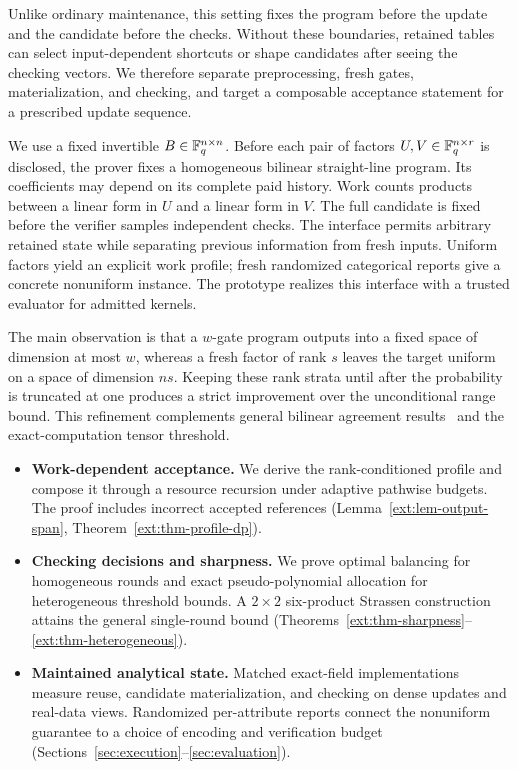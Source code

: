 Unlike ordinary maintenance, this setting fixes the program before the
update and the candidate before the checks. Without these boundaries,
retained tables can select input-dependent shortcuts or shape candidates
after seeing the checking vectors. We therefore separate preprocessing,
fresh gates, materialization, and checking, and target a composable
acceptance statement for a prescribed update sequence.

We use a fixed invertible $B\in\mathbb F_q^{n\times n}$. Before each pair of
factors $U,V\in\mathbb F_q^{n\times r}$ is disclosed, the prover fixes a
homogeneous bilinear straight-line program. Its coefficients may depend
on its complete paid history. Work counts products between a linear form
in $U$ and a linear form in $V$. The full candidate is fixed before the
verifier samples independent checks. The interface permits arbitrary
retained state while separating previous information from fresh inputs.
Uniform factors yield an explicit work profile; fresh randomized
categorical reports give a concrete nonuniform instance. The prototype
realizes this interface with a trusted evaluator for admitted kernels.

The main observation is that a $w$-gate program outputs into a fixed
space of dimension at most $w$, whereas a fresh factor of rank $s$
leaves the target uniform on a space of dimension $ns$. Keeping these
rank strata until after the probability is truncated at one produces a
strict improvement over the unconditional range bound. This refinement
complements general bilinear agreement results~\cite{cohen2022structure}
and the exact-computation tensor threshold.

\begin{itemize}
\item \textbf{Work-dependent acceptance.} We derive the rank-conditioned
profile and compose it through a resource recursion under adaptive
pathwise budgets. The proof includes incorrect accepted references
(Lemma~\ref{ext:lem-output-span}, Theorem~\ref{ext:thm-profile-dp}).
\item \textbf{Checking decisions and sharpness.} We prove optimal
balancing for homogeneous rounds and exact pseudo-polynomial allocation
for heterogeneous threshold bounds. A $2\times2$ six-product Strassen construction
attains the general single-round bound
(Theorems~\ref{ext:thm-sharpness}--\ref{ext:thm-heterogeneous}).
\item \textbf{Maintained analytical state.} Matched exact-field
implementations measure reuse, candidate materialization, and checking
on dense updates and real-data views. Randomized per-attribute reports
connect the nonuniform guarantee to a choice of encoding and verification
budget (Sections~\ref{sec:execution}--\ref{sec:evaluation}).
\end{itemize}

